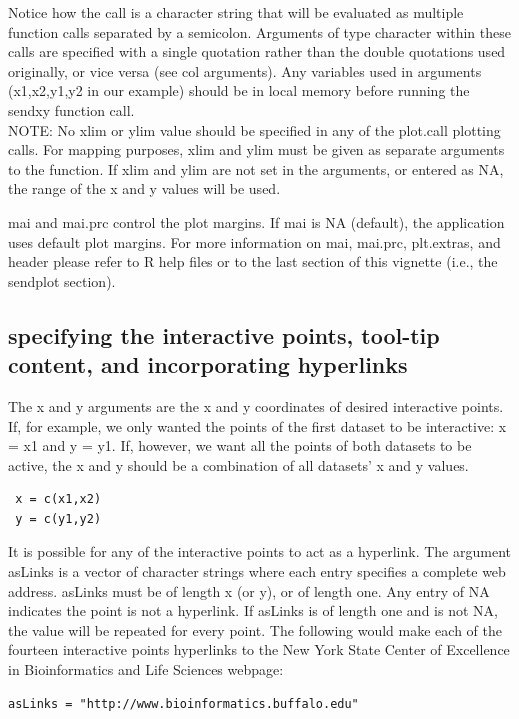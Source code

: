 \documentclass[]{article}
\begin{document}
Notice how the call is a character string that will be evaluated as multiple function calls separated by a semicolon. Arguments of type character within these calls are specified with a single quotation rather than the double quotations used originally, or vice versa (see col arguments). Any variables used in arguments (x1,x2,y1,y2 in our example) should be in local memory before running the sendxy function call. \\ \indent NOTE: No xlim or ylim value should be specified in any of the plot.call plotting calls. For mapping purposes, xlim and ylim must be given as separate arguments to the function. If xlim and ylim are not set in the arguments, or entered as NA, the range of the x and y values will be used. \newline

\indent mai and mai.prc control the plot margins. If mai is NA (default), the application uses default plot margins. For more information on mai, mai.prc, plt.extras, and header please refer to R help files or to the last section of this vignette (i.e., the sendplot section). \newline

\subsection{specifying the interactive points, tool-tip content, and incorporating hyperlinks}

\indent The x and y arguments are the x and y coordinates of desired interactive points. If, for example, we only wanted the points of the first dataset to be interactive: x = x1 and y = y1.  If, however, we want all the points of both datasets to be active, the x and y should be a combination of all datasets' x and y values.  
\begin{verbatim}
 x = c(x1,x2)
 y = c(y1,y2)
\end{verbatim}

\indent It is possible for any of the interactive points to act as a hyperlink. The argument asLinks is a vector of character strings where each entry specifies a complete web address. asLinks must be of length x (or y), or of length one. Any entry of NA indicates the point is not a hyperlink. If asLinks is of length one and is not NA, the value will be repeated for every point. \newline
\indent The following would make each of the fourteen interactive points hyperlinks to the New York State Center of Excellence in Bioinformatics and Life Sciences webpage:
\begin{verbatim}
asLinks = "http://www.bioinformatics.buffalo.edu"
\end{verbatim}
\end{document}
